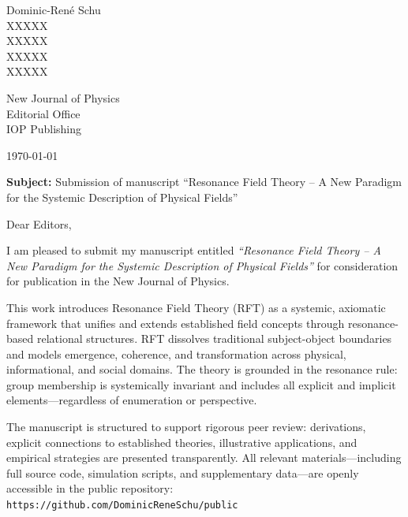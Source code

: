 \documentclass[a4paper,12pt]{article}
\begin{document}
	
	\vspace*{-2cm}
	
	Dominic-René Schu\\
	XXXXX\\
	XXXXX\\
	XXXXX\\
	XXXXX\\
	
	\vspace{1cm}
	
	New Journal of Physics\\
	Editorial Office\\
	IOP Publishing
	
	\vspace{1cm}
	
	\today
	
	\vspace{1cm}
	
	\textbf{Subject:} Submission of manuscript ``Resonance Field Theory – A New Paradigm for the Systemic Description of Physical Fields''
	
	\vspace{1cm}
	
	Dear Editors,
	
	\vspace{0.5cm}
	
	I am pleased to submit my manuscript entitled \textit{``Resonance Field Theory – A New Paradigm for the Systemic Description of Physical Fields''} for consideration for publication in the New Journal of Physics.
	
	This work introduces Resonance Field Theory (RFT) as a systemic, axiomatic framework that unifies and extends established field concepts through resonance-based relational structures. RFT dissolves traditional subject-object boundaries and models emergence, coherence, and transformation across physical, informational, and social domains. The theory is grounded in the resonance rule: group membership is systemically invariant and includes all explicit and implicit elements—regardless of enumeration or perspective.
	
	The manuscript is structured to support rigorous peer review: derivations, explicit connections to established theories, illustrative applications, and empirical strategies are presented transparently. All relevant materials—including full source code, simulation scripts, and supplementary data—are openly accessible in the public repository:\\
	\texttt{https://github.com/DominicReneSchu/public}
	
\end{document}
